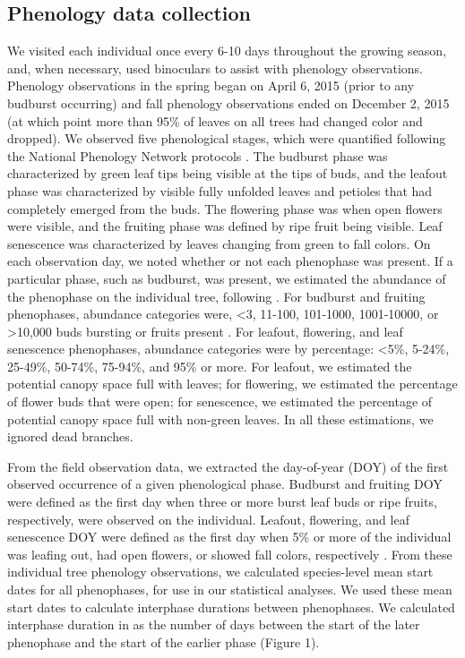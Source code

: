 \documentclass{article}
\begin{document}
\subsection*{Phenology data collection}
We visited each individual once every 6-10 days throughout the growing season, and, when necessary, used binoculars to assist with phenology observations. Phenology observations in the spring began on April 6, 2015 (prior to any budburst occurring) and fall phenology observations ended on December 2, 2015 (at which point more than 95\% of leaves on all trees had changed color and dropped). We observed five phenological stages, which were quantified following the National Phenology Network protocols \citep[for a full description see][]{denny2014}. The budburst phase was characterized by green leaf tips being visible at the tips of buds, and the leafout phase was characterized by visible fully unfolded leaves and petioles that had completely emerged from the buds. The flowering phase was when open flowers were visible, and the fruiting phase was defined by ripe fruit being visible. Leaf senescence was characterized by leaves changing from green to fall colors. On each observation day, we noted whether or not each phenophase was present. If a particular phase, such as budburst, was present, we estimated the abundance of the phenophase on the individual tree, following \citet{denny2014}. For budburst and fruiting phenophases, abundance categories were, <3, 11-100, 101-1000, 1001-10000, or >10,000 buds bursting or fruits present \citep{denny2014}. For leafout, flowering, and leaf senescence phenophases, abundance categories were by percentage: <5\%, 5-24\%, 25-49\%, 50-74\%, 75-94\%, and 95\% or more. For leafout, we estimated the potential canopy space full with leaves; for flowering, we estimated the percentage of flower buds that were open; for senescence, we estimated the percentage of potential canopy space full with non-green leaves. In all these estimations, we ignored dead branches. 
\par From the field observation data, we extracted the day-of-year (DOY) of the first observed occurrence of a given phenological phase. Budburst and fruiting DOY were defined as the first day when three or more burst leaf buds or ripe fruits, respectively, were observed on the individual. Leafout, flowering, and leaf senescence DOY were defined as the first day when 5\% or more of the individual was leafing out, had open flowers, or showed fall colors, respectively \citep{denny2014}. 
From these individual tree phenology observations, we calculated species-level mean start dates for all phenophases, for use in our statistical analyses. We used these mean start dates to calculate interphase durations between phenophases. We calculated interphase duration in as the number of days between the start of the later phenophase and the start of the earlier phase (Figure 1).
\end{document}
